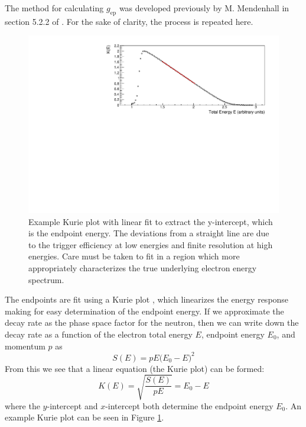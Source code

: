 The method for calculating $g_{\mathrm{ep}}$ was developed previously by M. Mendenhall in section
5.2.2 of \cite{mpmThesis}. For the sake of clarity, the process is repeated here.

\begin{figure}
  \centering
  \includegraphics[scale=0.75]{3-UCNAAnalysis/kuriePlot.pdf}
  \caption{Example Kurie plot with linear fit to extract the y-intercept, which is
    the endpoint energy. The deviations from a straight line are due to the
    trigger efficiency at low energies and finite resolution at high energies. Care
    must be taken to fit in a region which more appropriately characterizes the true
    underlying electron energy spectrum.}
  \label{fig:kuriePlot}
\end{figure}
  

The endpoints are fit using a Kurie plot \cite{kurie1936radiations}, which linearizes the
energy response making for easy determination of the endpoint energy. If we approximate
the decay rate as the phase space factor for the neutron, then we can write down
the decay rate as a function of the electron total energy $E$, endpoint
energy $E_0$, and momentum $p$ as
%
\begin{equation}
  S(E) = pE\big(E_0-E\big)^2
\end{equation}
%
From this we see that a linear equation (the Kurie plot) can be formed:
%
\begin{equation}
  K(E) = \sqrt{\frac{S(E)}{pE}} = E_0-E
\end{equation}
%
where the $y$-intercept and $x$-intercept both determine the endpoint energy $E_0$.
An example Kurie plot can be seen in Figure \ref{fig:kuriePlot}.


